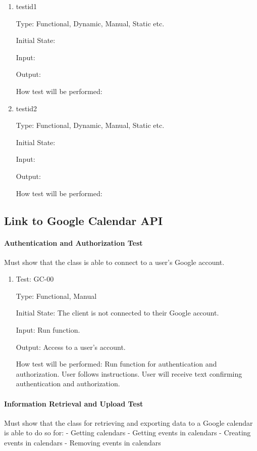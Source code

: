 \documentclass[12pt, titlepage]{article}
\begin{document}
\begin{enumerate}

\item{testid1\\}

Type: Functional, Dynamic, Manual, Static etc.
					
Initial State: 
					
Input: 
					
Output: 
					
How test will be performed: 
					
\item{testid2\\}

Type: Functional, Dynamic, Manual, Static etc.
					
Initial State: 
					
Input: 
					
Output: 
					
How test will be performed: 

\end{enumerate}

\subsection{Link to Google Calendar API}

\paragraph{Authentication and Authorization Test}
Must show that the class is able to connect to a user's Google account.
\begin{enumerate}

\item{Test: GC-00\\}

Type: Functional, Manual
					
Initial State: The client is not connected to their Google account. 
					
Input: Run function.
					
Output: Access to a user's account.
					
How test will be performed: Run function for authentication and authorization. 
User follows instructions. 
User will receive text confirming authentication and authorization.
\end{enumerate}

\paragraph{Information Retrieval and Upload Test}
Must show that the class for retrieving and exporting data to a Google calendar is able to do so for:
- Getting calendars
- Getting events in calendars
- Creating events in calendars
- Removing events in calendars
\end{document}
